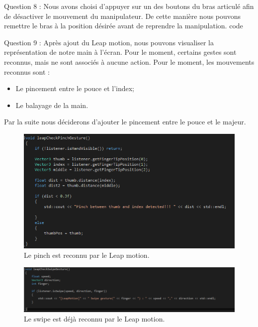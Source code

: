 \documentclass[a4paper,12pt]{article}
\begin{document}
Question 8 : Nous avons choisi d'appuyer sur un des boutons du bras articulé afin de désactiver le mouvement du manipulateur. De cette manière nous pouvons remettre le bras à la position désirée avant de reprendre la manipulation.
code

Question 9 : Après ajout du Leap motion, nous pouvons visualiser la représentation de notre main à l'écran. Pour le moment, certains gestes sont reconnus, mais ne sont associés à aucune action. Pour le moment, les mouvements reconnus sont :
\begin{itemize}
  \item Le pincement entre le pouce et l'index;
  \item Le balayage de la main.
\end{itemize}

Par la suite nous déciderons d'ajouter le pincement entre le pouce et le majeur.
\begin{figure}
  \centering
  \includegraphics{images/gestes_base.png}
  \caption{Le pinch est reconnu par le Leap motion.}
  \label{fig:}
\end{figure}
\begin{figure}
  \centering
  \includegraphics{images/gestes_base2.png}
  \caption{Le swipe est déjà reconnu par le Leap motion.}
  \label{fig:}
\end{figure}
\end{document}
